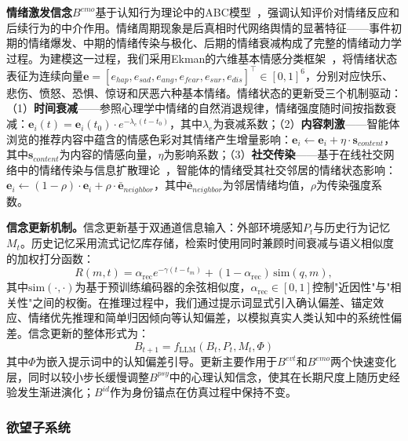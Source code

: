 \documentclass[lettersize,journal]{IEEEtran}
\begin{document}
\textbf{情绪激发信念}$B^{emo}$基于认知行为理论中的ABC模型~\cite{ellis_reason_1962}，强调认知评价对情绪反应和后续行为的中介作用。情绪周期现象是后真相时代网络舆情的显著特征——事件初期的情绪爆发、中期的情绪传染与极化、后期的情绪衰减构成了完整的情绪动力学过程。为建模这一过程，我们采用Ekman的六维基本情感分类框架~\cite{ekman_basic_1992}，将情绪状态表征为连续向量$\mathbf{e} = [e_{hap}, e_{sad}, e_{ang}, e_{fear}, e_{sur}, e_{dis}]^\top \in [0,1]^6$，分别对应快乐、悲伤、愤怒、恐惧、惊讶和厌恶六种基本情绪。情绪状态的更新受三个机制驱动：（1）\textbf{时间衰减}——参照心理学中情绪的自然消退规律，情绪强度随时间按指数衰减：$\mathbf{e}_i(t) = \mathbf{e}_i(t_0) \cdot e^{-\lambda_e(t-t_0)}$，其中$\lambda_e$为衰减系数；（2）\textbf{内容刺激}——智能体浏览的推荐内容中蕴含的情感色彩对其情绪产生增量影响：$\mathbf{e}_i \leftarrow \mathbf{e}_i + \eta \cdot \mathbf{s}_{content}$，其中$\mathbf{s}_{content}$为内容的情感向量，$\eta$为影响系数；（3）\textbf{社交传染}——基于在线社交网络中的情绪传染与信息扩散理论~\cite{hatfield_emotional_1994,kramer_experimental_2014,fan2023emotional_contagion}，智能体的情绪受其社交邻居的情绪状态影响：$\mathbf{e}_i \leftarrow (1-\rho) \cdot \mathbf{e}_i + \rho \cdot \bar{\mathbf{e}}_{neighbor}$，其中$\bar{\mathbf{e}}_{neighbor}$为邻居情绪均值，$\rho$为传染强度系数。

\textbf{信念更新机制。}信念更新基于双通道信息输入：外部环境感知$P_t$与历史行为记忆$M_t$。历史记忆采用流式记忆库存储，检索时使用同时兼顾时间衰减与语义相似度的加权打分函数：
\begin{equation}
R(m, t) = \alpha_{\mathrm{rec}} e^{-\gamma(t - t_m)} + (1-\alpha_{\mathrm{rec}})\,\text{sim}(q, m),
\label{eq:mmr}
\end{equation}
其中$\text{sim}(\cdot,\cdot)$为基于预训练编码器的余弦相似度，$\alpha_{\mathrm{rec}}\in[0,1]$控制"近因性"与"相关性"之间的权衡。在推理过程中，我们通过提示词显式引入确认偏差、锚定效应、情绪优先推理和简单归因倾向等认知偏差，以模拟真实人类认知中的系统性偏差。信念更新的整体形式为：
\begin{equation}
B_{t+1} = f_{\text{LLM}}(B_t, P_t, M_t, \Phi)
\label{eq:belief_update}
\end{equation}
其中$\Phi$为嵌入提示词中的认知偏差引导。更新主要作用于$B^{evt}$和$B^{emo}$两个快速变化层，同时以较小步长缓慢调整$B^{psy}$中的心理认知信念，使其在长期尺度上随历史经验发生渐进演化；$B^{id}$作为身份锚点在仿真过程中保持不变。

\subsubsection{欲望子系统}
\end{document}
